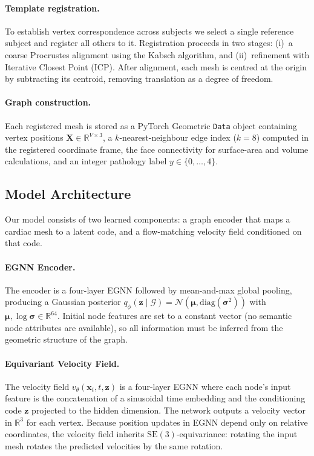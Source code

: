 \documentclass{article}
\newcommand{\R}{\mathbb{R}}
\newcommand{\SE}{\mathrm{SE}(3)}
\begin{document}
\paragraph{Template registration.}
To establish vertex correspondence across subjects we select a single
reference subject and register all others to it.
Registration proceeds in two stages: (i)~a coarse Procrustes
alignment using the Kabsch algorithm, and (ii)~refinement with
Iterative Closest Point (ICP).
After alignment, each mesh is centred at the origin by subtracting
its centroid, removing translation as a degree of freedom.

\paragraph{Graph construction.}
Each registered mesh is stored as a PyTorch Geometric
\texttt{Data} object containing vertex positions
$\mathbf{X} \in \R^{V \times 3}$, a $k$-nearest-neighbour edge index
($k = 8$) computed in the registered coordinate frame, the face
connectivity for surface-area and volume calculations, and an integer
pathology label $y \in \{0, \ldots, 4\}$.

\subsection{Model Architecture}
\label{sec:method_arch}

Our model consists of two learned components: a graph encoder that maps
a cardiac mesh to a latent code, and a flow-matching velocity field
conditioned on that code.

\paragraph{EGNN Encoder.}
The encoder is a four-layer EGNN followed by mean-and-max global
pooling, producing a Gaussian posterior
$q_\phi(\mathbf{z} \mid \mathcal{G}) = \mathcal{N}(\boldsymbol{\mu},
\text{diag}(\boldsymbol{\sigma}^2))$
with $\boldsymbol{\mu}, \log\boldsymbol{\sigma} \in \R^{64}$.
Initial node features are set to a constant vector
(no semantic node attributes are available), so all information must be
inferred from the geometric structure of the graph.

\paragraph{Equivariant Velocity Field.}
The velocity field $v_\theta(\mathbf{x}_t, t, \mathbf{z})$ is a
four-layer EGNN where each node's input feature is the concatenation
of a sinusoidal time embedding and the conditioning code $\mathbf{z}$
projected to the hidden dimension.
The network outputs a velocity vector in $\R^3$ for each vertex.
Because position updates in EGNN depend only on relative coordinates,
the velocity field inherits $\SE$-equivariance: rotating the input
mesh rotates the predicted velocities by the same rotation.
\end{document}
